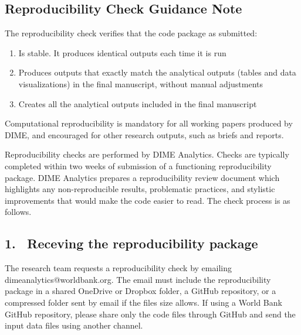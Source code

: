 


	\begin{fullwidth}


	\section*{Reproducibility Check Guidance Note}

The reproducibility check verifies that the code package as submitted:

	\begin{enumerate}
		\setlength\itemsep{-0.1em}
		\item Is stable. It produces identical outputs each time it is run
		\item Produces outputs that exactly match the analytical outputs (tables and data visualizations) in the final manuscript, without manual adjustments
		\item Creates all the analytical outputs included in the final manuscript
	\end{enumerate}

Computational reproducibility is mandatory for all working papers produced by DIME, and encouraged for other research outputs, such as briefs and reports. 


	\bigskip

	Reproducibility checks are performed by DIME Analytics. Checks are typically completed within two weeks of submission of a functioning reproducibility package. DIME Analytics prepares a reproducibility review document which highlights any non-reproducible results, problematic practices, and stylistic improvements that would make the code easier to read. The check process is as follows.

	\subsection{1. \, Receving the reproducibility package}

	The research team requests a reproducibility check by emailing dimeanalytics@worldbank.org. The email must include the reproducibility package in a shared OneDrive or Dropbox folder, a GitHub repository, or a compressed folder sent by email if the files size allows. If using a World Bank GitHub repository, please share only the code files through GitHub and send the input data files using another channel. 
	

\end{fullwidth}
